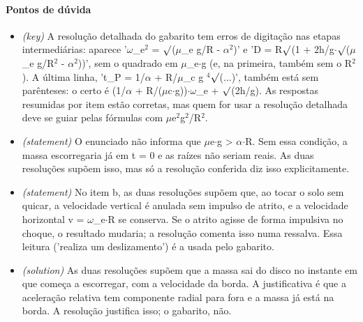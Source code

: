 \documentclass{article}%
\begin{document}
\paragraph{Pontos de dúvida}%
\begin{itemize}%
\item%
\textit{(key)} A resolução detalhada do gabarito tem erros de digitação nas etapas intermediárias: aparece '$\omega$\_e$^2$ = $\surd$($\mu$\_e g/R - $\alpha$$^2$)' e 'D = R$\surd$(1 + 2h/g$\cdot$$\surd$($\mu$\_e g/R$^2$ - $\alpha$$^2$))', sem o quadrado em $\mu$\_e$\cdot$g (e, na primeira, também sem o R$^2$). A última linha, 't\_P = 1/$\alpha$ + R/$\mu$\_c g $^{4}$$\surd$(...)', também está sem parênteses: o certo é (1/$\alpha$ + R/($\mu$c$\cdot$g))$\cdot$$\omega$\_e + $\surd$(2h/g). As respostas resumidas por item estão corretas, mas quem for usar a resolução detalhada deve se guiar pelas fórmulas com $\mu$e$^2$g$^2$/R$^2$.%
\item%
\textit{(statement)} O enunciado não informa que $\mu$e$\cdot$g > $\alpha$$\cdot$R. Sem essa condição, a massa escorregaria já em t = 0 e as raízes não seriam reais. As duas resoluções supõem isso, mas só a resolução conferida diz isso explicitamente.%
\item%
\textit{(statement)} No item b, as duas resoluções supõem que, ao tocar o solo sem quicar, a velocidade vertical é anulada sem impulso de atrito, e a velocidade horizontal v = $\omega$\_e$\cdot$R se conserva. Se o atrito agisse de forma impulsiva no choque, o resultado mudaria; a resolução comenta isso numa ressalva. Essa leitura ('realiza um deslizamento') é a usada pelo gabarito.%
\item%
\textit{(solution)} As duas resoluções supõem que a massa sai do disco no instante em que começa a escorregar, com a velocidade da borda. A justificativa é que a aceleração relativa tem componente radial para fora e a massa já está na borda. A resolução justifica isso; o gabarito, não.%
\end{itemize}%
\end{document}
